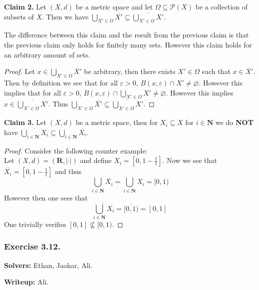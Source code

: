 \documentclass{article}
\newcommand{\R}{\mathbf{R}}
\newcommand{\NA}{\mathbf{N}}
\theoremstyle{plain} %
\numberwithin{thm}{section} %
\theoremstyle{definition}
\begin{document}
    \textbf{Claim 2.} Let $(X,d)$ be a metric space and let $\Omega \subseteq \mathcal{P}(X)$ be a collection of subsets of $X$. Then we have $\bigcup\limits_{X' \in \Omega} \overline{X'} \subseteq \overline{\bigcup\limits_{X' \in \Omega} X'}$.

    The difference between this claim and the result from the previous claim is that the previous claim only holds for finitely many sets. However this claim holds for an arbitrary amount of sets.

    \begin{proof}
        Let $x \in \bigcup\limits_{X' \in \Omega} \overline{X'}$ be arbitrary, then there exists $X' \in \Omega$ such that $x \in \overline{X'}$. Then by definition we see that for all $\varepsilon > 0$, $B(x,\varepsilon) \cap X' \neq \varnothing$. However this implies that for all $\varepsilon > 0$, $B(x,\varepsilon) \cap \bigcup\limits_{X' \in \Omega} X' \neq \varnothing$. However this implies $x \in \overline{\bigcup\limits_{X' \in \Omega} X'}$. Thus $\bigcup\limits_{X' \in \Omega} \overline{X'} \subseteq \overline{\bigcup\limits_{X' \in \Omega} X'}$.
    \end{proof}

    \textbf{Claim 3.} Let $(X,d)$ be a metric space, then for $X_i \subseteq X$ for $i \in \NA$ we do \textbf{NOT} have $\overline{\bigcup\limits_{i \in \NA} X_i} \subseteq \bigcup\limits_{i \in \NA} \overline{X_i}$.

    \begin{proof}
        Consider the following counter example:\\
        Let $(X,d) = (\R, |\cdot|)$ and define $X_i = \left[0, 1-\frac{1}{i}\right]$.
        Now we see that $\overline{X_i} = \left[0, 1-\frac{1}{i}\right]$ and thus $$\bigcup\limits_{i \in \NA} \overline{X_i} = \bigcup\limits_{i \in \NA} X_i = [0,1)$$
        However then one sees that $$\overline{\bigcup\limits_{i \in \NA} X_i} = \overline{[0,1)} = [0,1]$$
        One trivially verifies $[0,1] \not\subseteq [0,1)$.
    \end{proof}

    \subsubsection{Exercise 3.12.}

    \noindent\textbf{Solvers:} Ethan, Jaohar, Ali.

    \noindent\textbf{Writeup:} Ali.
\end{document}
